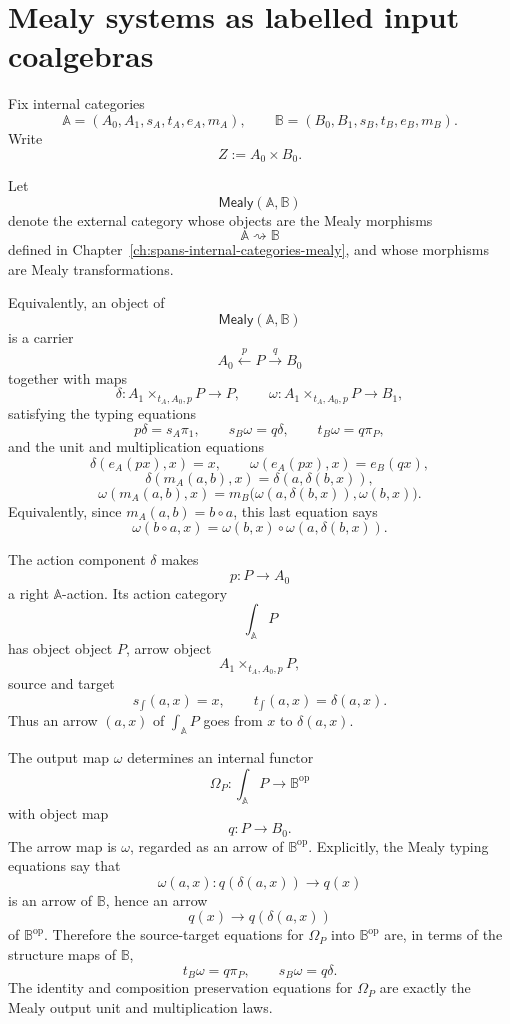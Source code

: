 \section{Mealy systems as labelled input coalgebras}
\label{sec:mealy-systems-labelled-input-coalgebras}

Fix internal categories
\[
\mathbb A=(A_0,A_1,s_A,t_A,e_A,m_A),
\qquad
\mathbb B=(B_0,B_1,s_B,t_B,e_B,m_B).
\]
Write
\[
Z:=A_0\times B_0.
\]

Let
\[
\mathsf{Mealy}(\mathbb A,\mathbb B)
\]
denote the external category whose objects are the Mealy morphisms
\[
\mathbb A\rightsquigarrow\mathbb B
\]
defined in Chapter~\ref{ch:spans-internal-categories-mealy}, and whose
morphisms are Mealy transformations.

Equivalently, an object of
\[
\mathsf{Mealy}(\mathbb A,\mathbb B)
\]
is a carrier
\[
A_0\xleftarrow{p}P\xrightarrow{q}B_0
\]
together with maps
\[
\delta:
A_1\times_{t_A,A_0,p}P\to P,
\qquad
\omega:
A_1\times_{t_A,A_0,p}P\to B_1,
\]
satisfying the typing equations
\[
p\delta=s_A\pi_1,
\qquad
s_B\omega=q\delta,
\qquad
t_B\omega=q\pi_P,
\]
and the unit and multiplication equations
\[
\delta(e_A(px),x)=x,
\qquad
\omega(e_A(px),x)=e_B(qx),
\]
\[
\delta(m_A(a,b),x)=\delta(a,\delta(b,x)),
\]
\[
\omega(m_A(a,b),x)
=
m_B\bigl(\omega(a,\delta(b,x)),\omega(b,x)\bigr).
\]
Equivalently, since \(m_A(a,b)=b\circ a\), this last equation says
\[
\omega(b\circ a,x)
=
\omega(b,x)\circ\omega(a,\delta(b,x)).
\]

The action component \(\delta\) makes
\[
p:P\to A_0
\]
a right \(\mathbb A\)-action. Its action category
\[
\int_{\mathbb A}P
\]
has object object \(P\), arrow object
\[
A_1\times_{t_A,A_0,p}P,
\]
source and target
\[
s_{\int}(a,x)=x,
\qquad
t_{\int}(a,x)=\delta(a,x).
\]
Thus an arrow \((a,x)\) of \(\int_{\mathbb A}P\) goes from \(x\) to
\(\delta(a,x)\).

The output map \(\omega\) determines an internal functor
\[
\Omega_P:\int_{\mathbb A}P\to\mathbb B^{\mathrm{op}}
\]
with object map
\[
q:P\to B_0.
\]
The arrow map is \(\omega\), regarded as an arrow of
\(\mathbb B^{\mathrm{op}}\). Explicitly, the Mealy typing equations say that
\[
\omega(a,x):q(\delta(a,x))\to q(x)
\]
is an arrow of \(\mathbb B\), hence an arrow
\[
q(x)\to q(\delta(a,x))
\]
of \(\mathbb B^{\mathrm{op}}\). Therefore the source-target equations for
\(\Omega_P\) into \(\mathbb B^{\mathrm{op}}\) are, in terms of the structure
maps of \(\mathbb B\),
\[
t_B\omega=q\pi_P,
\qquad
s_B\omega=q\delta.
\]
The identity and composition preservation equations for \(\Omega_P\) are
exactly the Mealy output unit and multiplication laws.

